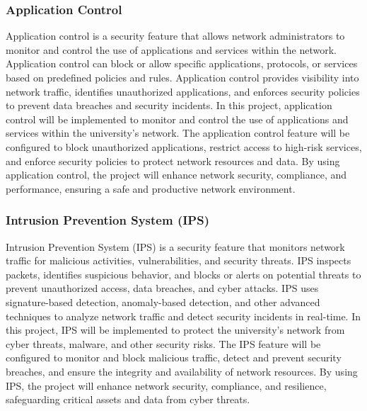 \documentclass[12pt]{report}
\begin{document}
\subsubsection{Application Control}
Application control is a security feature that allows network administrators to monitor and control the use of applications and services within the network. Application control can block or allow specific applications, protocols, or services based on predefined policies and rules. Application control provides visibility into network traffic, identifies unauthorized applications, and enforces security policies to prevent data breaches and security incidents. In this project, application control will be implemented to monitor and control the use of applications and services within the university's network. The application control feature will be configured to block unauthorized applications, restrict access to high-risk services, and enforce security policies to protect network resources and data. By using application control, the project will enhance network security, compliance, and performance, ensuring a safe and productive network environment. \cite{AppControl}
\subsubsection{Intrusion Prevention System (IPS)}
Intrusion Prevention System (IPS) is a security feature that monitors network traffic for malicious activities, vulnerabilities, and security threats. IPS inspects packets, identifies suspicious behavior, and blocks or alerts on potential threats to prevent unauthorized access, data breaches, and cyber attacks. IPS uses signature-based detection, anomaly-based detection, and other advanced techniques to analyze network traffic and detect security incidents in real-time. In this project, IPS will be implemented to protect the university's network from cyber threats, malware, and other security risks. The IPS feature will be configured to monitor and block malicious traffic, detect and prevent security breaches, and ensure the integrity and availability of network resources. By using IPS, the project will enhance network security, compliance, and resilience, safeguarding critical assets and data from cyber threats. \cite{IPS}
\end{document}

